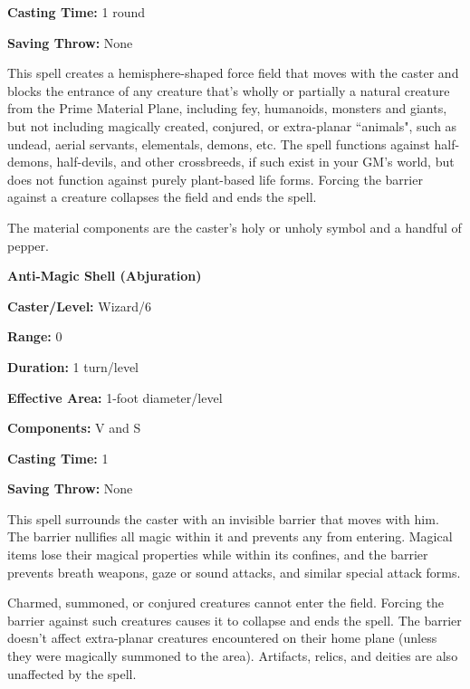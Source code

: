 \begin{multicols}{2}
\begin{minipage}{\columnwidth}
\noindent \textbf{Casting Time:} 1 round

\noindent \textbf{Saving Throw:} None

\end{minipage}

This spell creates a hemisphere-shaped force field that moves with the caster and blocks the entrance of any creature that's wholly or partially a natural creature from the Prime Material Plane, including fey, humanoids, monsters and giants, but not including magically created, conjured, or extra-planar ``animals", such as undead, aerial servants, elementals, demons, etc.  The spell functions against half-demons, half-devils, and other crossbreeds, if such exist in your GM's world, but does not function against purely plant-based life forms.  Forcing the barrier against a creature collapses the field and ends the spell.

The material components are the caster's holy or unholy symbol and a handful of pepper.

\vspace{1em}
 
\noindent
\begin{minipage}{\columnwidth}

\noindent \textbf{Anti-Magic Shell (Abjuration)}

\noindent \textbf{Caster/Level:} Wizard/6

\noindent \textbf{Range:} 0

\noindent \textbf{Duration:} 1 turn/level 

\noindent \textbf{Effective Area:} 1-foot diameter/level

\noindent \textbf{Components:} V and S

\noindent \textbf{Casting Time:} 1

\noindent \textbf{Saving Throw:} None

\end{minipage}

This spell surrounds the caster with an invisible barrier that moves with him.  The barrier nullifies all magic within it and prevents any from entering.  Magical items lose their magical properties while within its confines, and the barrier prevents breath weapons, gaze or sound attacks, and similar special attack forms.

Charmed, summoned, or conjured creatures cannot enter the field.  Forcing the barrier against such creatures causes it to collapse and ends the spell.  The barrier doesn't affect extra-planar creatures encountered on their home plane (unless they were magically summoned to the area).  Artifacts, relics, and deities are also unaffected by the spell.


\end{multicols}
